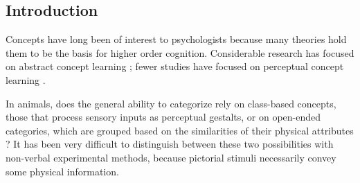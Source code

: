 \documentclass[a0,portrait]{a0poster}
\begin{document}

\begin{multicols}{2} %
\hyphenchar{}


%
%
%


\color{Maroon} %

\section*{Introduction}

Concepts have long been of interest to psychologists because many theories hold them to be the basis for higher order cognition. Considerable research has focused on abstract concept learning \cite{katz2007}; fewer studies have focused on perceptual concept learning \cite{vonk2002natural}.

In animals, does the general ability to categorize rely on class-based concepts, those that process sensory inputs as perceptual gestalts, or on open-ended categories, which are grouped based on the similarities of their physical attributes \cite{herrnstein1990}? It has been very difficult to distinguish between these two possibilities with non-verbal experimental methods, because pictorial stimuli necessarily convey some physical information.


\end{multicols}
\end{document}
